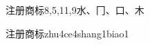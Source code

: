 \begin{entry}{注册商标}{8,5,11,9}{⽔、⼌、⼝、⽊}
  \begin{phonetics}{注册商标}{zhu4ce4shang1biao1}
  \end{phonetics}
\end{entry}
